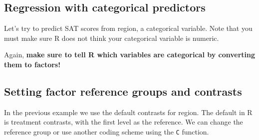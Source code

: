\documentclass[]{book}
\newenvironment{Shaded}{\begin{snugshade}}{\end{snugshade}}
\newcommand{\KeywordTok}[1]{\textcolor[rgb]{0.13,0.29,0.53}{\textbf{#1}}}
\newcommand{\DataTypeTok}[1]{\textcolor[rgb]{0.13,0.29,0.53}{#1}}
\newcommand{\DecValTok}[1]{\textcolor[rgb]{0.00,0.00,0.81}{#1}}
\newcommand{\StringTok}[1]{\textcolor[rgb]{0.31,0.60,0.02}{#1}}
\newcommand{\CommentTok}[1]{\textcolor[rgb]{0.56,0.35,0.01}{\textit{#1}}}
\newcommand{\OperatorTok}[1]{\textcolor[rgb]{0.81,0.36,0.00}{\textbf{#1}}}
\newcommand{\NormalTok}[1]{#1}
\begin{document}
\subsection{Regression with categorical
predictors}\label{regression-with-categorical-predictors}

Let's try to predict SAT scores from region, a categorical variable.
Note that you must make sure R does not think your categorical variable
is numeric.

\begin{Shaded}
\end{Shaded}

Again, \textbf{make sure to tell R which variables are categorical by
converting them to factors!}

\subsection{Setting factor reference groups and
contrasts}\label{setting-factor-reference-groups-and-contrasts}

In the previous example we use the default contrasts for region. The
default in R is treatment contrasts, with the first level as the
reference. We can change the reference group or use another coding
scheme using the \texttt{C} function.

\begin{Shaded}
\end{Shaded}
\end{document}
